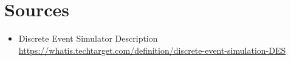 \documentclass{article}
\begin{document}
\section*{Sources}
\begin{itemize}
    \item Discrete Event Simulator Description \\ 
        \href{https://whatis.techtarget.com/definition/discrete-event-simulation-DES}{https://whatis.techtarget.com/definition/discrete-event-simulation-DES}
\end{itemize}
\end{document}
